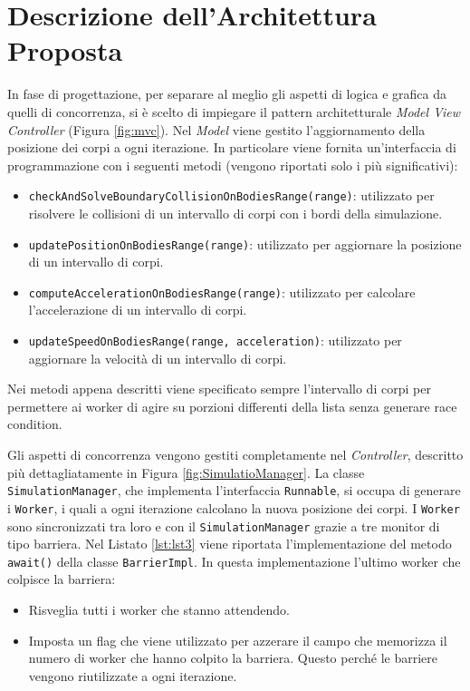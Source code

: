 \documentclass[12pt,a4paper,openright,twoside]{book}
\begin{document}
\chapter{Descrizione dell'Architettura Proposta}
\label{chap:Descrizione dell'Architettura Proposta}

In fase di progettazione, per separare al meglio gli aspetti di logica e grafica da quelli di concorrenza, si è scelto di
impiegare il pattern architetturale \textit{Model View Controller} (Figura \ref{fig:mvc}).
Nel \textit{Model} viene gestito l'aggiornamento della posizione dei corpi a ogni iterazione. In particolare viene fornita 
un'interfaccia di programmazione con i seguenti metodi (vengono riportati solo i più significativi):
\begin{itemize}
	\item \texttt{checkAndSolveBoundaryCollisionOnBodiesRange(range)}: 
	utilizzato per risolvere le collisioni di un intervallo di corpi con i bordi della simulazione.
	\item \texttt{updatePositionOnBodiesRange(range)}:
	utilizzato per aggiornare la posizione di un intervallo di corpi.
	\item \texttt{computeAccelerationOnBodiesRange(range)}:
	utilizzato per calcolare l'accelerazione di un intervallo di corpi.
	\item \texttt{updateSpeedOnBodiesRange(range, acceleration)}:
	utilizzato per aggiornare la velocità di un intervallo di corpi.
\end{itemize}
Nei metodi appena descritti viene specificato sempre l'intervallo di corpi per permettere ai worker di agire su porzioni 
differenti della lista senza generare race condition.

Gli aspetti di concorrenza vengono gestiti completamente nel \textit{Controller},
descritto più dettagliatamente in Figura \ref{fig:SimulatioManager}.
La classe \texttt{SimulationManager}, che implementa l'interfaccia \texttt{Runnable},
si occupa di generare i \texttt{Worker}, i quali a ogni iterazione
calcolano la nuova posizione dei corpi.
I \texttt{Worker} sono sincronizzati tra loro e con il \texttt{SimulationManager}
grazie a tre monitor di tipo barriera.
Nel Listato \ref{lst:lst3} viene riportata l'implementazione del metodo \texttt{await()} della classe \texttt{BarrierImpl}.
In questa implementazione l'ultimo worker che colpisce la barriera:
\begin{itemize}
	\item Risveglia tutti i worker che stanno attendendo.
	\item Imposta un flag che viene utilizzato per azzerare il campo
	che memorizza il numero di worker che hanno colpito la barriera.
	Questo perché le barriere vengono riutilizzate a ogni iterazione.
\end{itemize}
\end{document}
